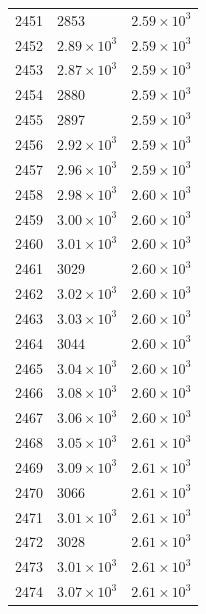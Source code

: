\begin{table}[H]
\begin{tabular}{lll}
2451 & 2853 & $\displaystyle 2.59 \times 10^{3}$ \\
2452 & $\displaystyle 2.89 \times 10^{3}$ & $\displaystyle 2.59 \times 10^{3}$ \\
2453 & $\displaystyle 2.87 \times 10^{3}$ & $\displaystyle 2.59 \times 10^{3}$ \\
2454 & 2880 & $\displaystyle 2.59 \times 10^{3}$ \\
2455 & 2897 & $\displaystyle 2.59 \times 10^{3}$ \\
2456 & $\displaystyle 2.92 \times 10^{3}$ & $\displaystyle 2.59 \times 10^{3}$ \\
2457 & $\displaystyle 2.96 \times 10^{3}$ & $\displaystyle 2.59 \times 10^{3}$ \\
2458 & $\displaystyle 2.98 \times 10^{3}$ & $\displaystyle 2.60 \times 10^{3}$ \\
2459 & $\displaystyle 3.00 \times 10^{3}$ & $\displaystyle 2.60 \times 10^{3}$ \\
2460 & $\displaystyle 3.01 \times 10^{3}$ & $\displaystyle 2.60 \times 10^{3}$ \\
2461 & 3029 & $\displaystyle 2.60 \times 10^{3}$ \\
2462 & $\displaystyle 3.02 \times 10^{3}$ & $\displaystyle 2.60 \times 10^{3}$ \\
2463 & $\displaystyle 3.03 \times 10^{3}$ & $\displaystyle 2.60 \times 10^{3}$ \\
2464 & 3044 & $\displaystyle 2.60 \times 10^{3}$ \\
2465 & $\displaystyle 3.04 \times 10^{3}$ & $\displaystyle 2.60 \times 10^{3}$ \\
2466 & $\displaystyle 3.08 \times 10^{3}$ & $\displaystyle 2.60 \times 10^{3}$ \\
2467 & $\displaystyle 3.06 \times 10^{3}$ & $\displaystyle 2.60 \times 10^{3}$ \\
2468 & $\displaystyle 3.05 \times 10^{3}$ & $\displaystyle 2.61 \times 10^{3}$ \\
2469 & $\displaystyle 3.09 \times 10^{3}$ & $\displaystyle 2.61 \times 10^{3}$ \\
2470 & 3066 & $\displaystyle 2.61 \times 10^{3}$ \\
2471 & $\displaystyle 3.01 \times 10^{3}$ & $\displaystyle 2.61 \times 10^{3}$ \\
2472 & 3028 & $\displaystyle 2.61 \times 10^{3}$ \\
2473 & $\displaystyle 3.01 \times 10^{3}$ & $\displaystyle 2.61 \times 10^{3}$ \\
2474 & $\displaystyle 3.07 \times 10^{3}$ & $\displaystyle 2.61 \times 10^{3}$ \\

\end{tabular}
\end{table}
